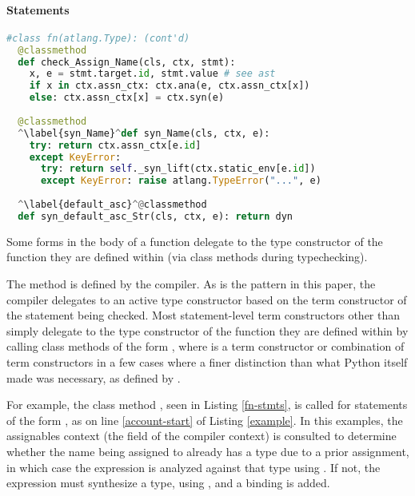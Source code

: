 
\paragraph{Statements}
\begin{codelisting}[t]
\begin{lstlisting}[language=Python]
#class fn(atlang.Type): (cont'd) 
  @classmethod
  def check_Assign_Name(cls, ctx, stmt):
    x, e = stmt.target.id, stmt.value # see ast
    if x in ctx.assn_ctx: ctx.ana(e, ctx.assn_ctx[x])
    else: ctx.assn_ctx[x] = ctx.syn(e)
    
  @classmethod
  ^\label{syn_Name}^def syn_Name(cls, ctx, e):
    try: return ctx.assn_ctx[e.id]
    except KeyError:
      try: return self._syn_lift(ctx.static_env[e.id])
      except KeyError: raise atlang.TypeError("...", e)
  
  ^\label{default_asc}^@classmethod
  def syn_default_asc_Str(cls, ctx, e): return dyn
\end{lstlisting}
\caption{Some forms in the body of a function delegate to the type constructor of the function they are defined within (via class methods during typechecking).}
\label{fn-stmts}
\end{codelisting}
The  method is defined by the compiler. As is the pattern in this paper, the compiler delegates to an active type constructor based on the term constructor of the statement being checked. Most statement-level term constructors other than  simply delegate to the type constructor of the function they are defined within by calling class methods of the form , where  is a term constructor or combination of term constructors in a few cases where a finer distinction than what Python itself made was necessary, as defined by .

For example, the class method , seen in Listing \ref{fn-stmts}, is called for statements of the form , as on line \ref{account-start} of Listing \ref{example}. In this examples, the assignables context (the  field of the compiler context) is consulted to determine whether the name being assigned to already has a type due to a prior assignment, in which case the expression is analyzed against that type using . If not, the expression must synthesize a type, using , and a binding is added. %

